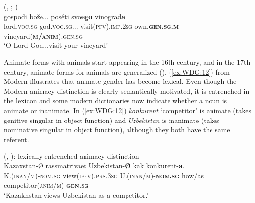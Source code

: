 \documentclass[output=collectionpaper]{langsci/langscibook}
\begin{document}
\ea\label{ex:WDG:11}
 (, ; \citealt[267]{Dietze1973})\\
\gll gospodi	bože...	posěti	svo\textbf{ego}	vinograd\textbf{a}\\
lord.\textsc{voc.sg}	god.\textsc{voc.sg}...	visit(\textsc{pfv}).\textsc{imp.2sg}	own.\textbf{\textsc{gen.sg.m}}	vineyard(\textbf{\textsc{m/anim}}).\textsc{gen.sg}\\
\glt `O Lord God...visit your vineyard'\\
\z

Animate forms with animals start appearing in the 16th century, and in the 17th century, animate forms for animals are generalized (\citealt[270]{Dietze1973}). (\ref{ex:WDG:12}) from Modern  illustrates that animate gender has become lexical. Even though the Modern  animacy distinction is clearly semantically motivated, it is entrenched in the lexicon and some modern dictionaries now indicate whether a noun is animate or inanimate. In (\ref{ex:WDG:12}) \textit{konkurent} `competitor' is animate (takes genitive singular in object function) and \textit{Uzbekistan} is inanimate (takes nominative singular in object function), although they both have the same referent.

\ea\label{ex:WDG:12}
 (, ): lexically entrenched animacy distinction\\
\gll Kazaxstan-Ø	rassmatrivaet	Uzbekistan-\textbf{Ø}	kak	konkurent-\textbf{a}.\\
K.(\textsc{inan/m)-nom.sg}	view(\textsc{ipfv}).\textsc{prs.3sg}	U.(\textsc{inan/m})-\textbf{\textsc{nom.sg}}	how/as	competitor(\textsc{anim/m})-\textbf{\textsc{gen.sg}}\\
\glt `Kazakhstan views Uzbekistan as a competitor.'\\
\z
\end{document}

